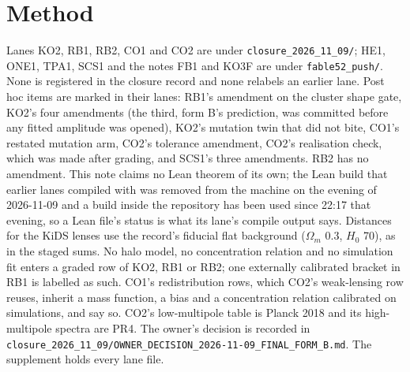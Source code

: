 \documentclass[10pt]{article}
\begin{document}
\section*{Method}
Lanes KO2, RB1, RB2, CO1 and CO2 are under \texttt{closure\_2026\_11\_09/}; HE1, ONE1, TPA1, SCS1 and the notes FB1 and KO3F are under \texttt{fable52\_push/}. None is registered in the closure record and none relabels an earlier lane. Post hoc items are marked in their lanes: RB1's amendment on the cluster shape gate, KO2's four amendments (the third, form B's prediction, was committed before any fitted amplitude was opened), KO2's mutation twin that did not bite, CO1's restated mutation arm, CO2's tolerance amendment, CO2's realisation check, which was made after grading, and SCS1's three amendments. RB2 has no amendment. This note claims no Lean theorem of its own; the Lean build that earlier lanes compiled with was removed from the machine on the evening of 2026-11-09 and a build inside the repository has been used since 22:17 that evening, so a Lean file's status is what its lane's compile output says. Distances for the KiDS lenses use the record's fiducial flat background ($\Omega_m$ 0.3, $H_0$ 70), as in the staged sums. No halo model, no concentration relation and no simulation fit enters a graded row of KO2, RB1 or RB2; one externally calibrated bracket in RB1 is labelled as such. CO1's redistribution rows, which CO2's weak-lensing row reuses, inherit a mass function, a bias and a concentration relation calibrated on simulations, and say so. CO2's low-multipole table is Planck 2018 and its high-multipole spectra are PR4. The owner's decision is recorded in \texttt{closure\_2026\_11\_09/OWNER\_DECISION\_2026-11-09\_FINAL\_FORM\_B.md}. The supplement holds every lane file.
\end{document}
